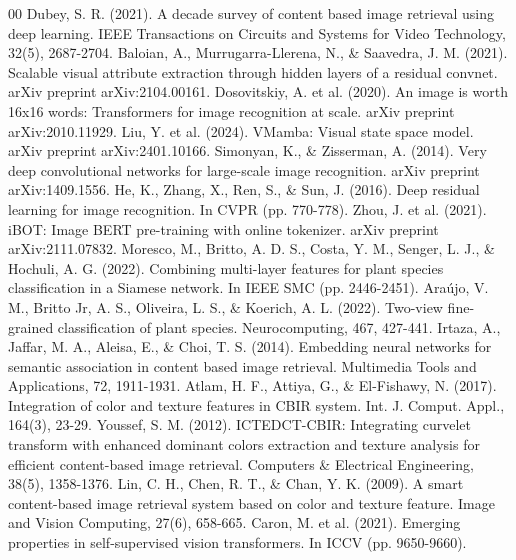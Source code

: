 \documentclass[conference]{IEEEtran}
\begin{document}
\begin{thebibliography}{00}
 Dubey, S. R. (2021). A decade survey of content based image retrieval using deep learning. IEEE Transactions on Circuits and Systems for Video Technology, 32(5), 2687-2704.
 Baloian, A., Murrugarra-Llerena, N., \& Saavedra, J. M. (2021). Scalable visual attribute extraction through hidden layers of a residual convnet. arXiv preprint arXiv:2104.00161.
 Dosovitskiy, A. et al. (2020). An image is worth 16x16 words: Transformers for image recognition at scale. arXiv preprint arXiv:2010.11929.
 Liu, Y. et al. (2024). VMamba: Visual state space model. arXiv preprint arXiv:2401.10166.
 Simonyan, K., \& Zisserman, A. (2014). Very deep convolutional networks for large-scale image recognition. arXiv preprint arXiv:1409.1556.
 He, K., Zhang, X., Ren, S., \& Sun, J. (2016). Deep residual learning for image recognition. In CVPR (pp. 770-778).
 Zhou, J. et al. (2021). iBOT: Image BERT pre-training with online tokenizer. arXiv preprint arXiv:2111.07832.
 Moresco, M., Britto, A. D. S., Costa, Y. M., Senger, L. J., \& Hochuli, A. G. (2022). Combining multi-layer features for plant species classification in a Siamese network. In IEEE SMC (pp. 2446-2451).
 Araújo, V. M., Britto Jr, A. S., Oliveira, L. S., \& Koerich, A. L. (2022). Two-view fine-grained classification of plant species. Neurocomputing, 467, 427-441.
 Irtaza, A., Jaffar, M. A., Aleisa, E., \& Choi, T. S. (2014). Embedding neural networks for semantic association in content based image retrieval. Multimedia Tools and Applications, 72, 1911-1931.
 Atlam, H. F., Attiya, G., \& El-Fishawy, N. (2017). Integration of color and texture features in CBIR system. Int. J. Comput. Appl., 164(3), 23-29.
 Youssef, S. M. (2012). ICTEDCT-CBIR: Integrating curvelet transform with enhanced dominant colors extraction and texture analysis for efficient content-based image retrieval. Computers \& Electrical Engineering, 38(5), 1358-1376.
 Lin, C. H., Chen, R. T., \& Chan, Y. K. (2009). A smart content-based image retrieval system based on color and texture feature. Image and Vision Computing, 27(6), 658-665.
 Caron, M. et al. (2021). Emerging properties in self-supervised vision transformers. In ICCV (pp. 9650-9660).
\end{thebibliography}
\end{document}
